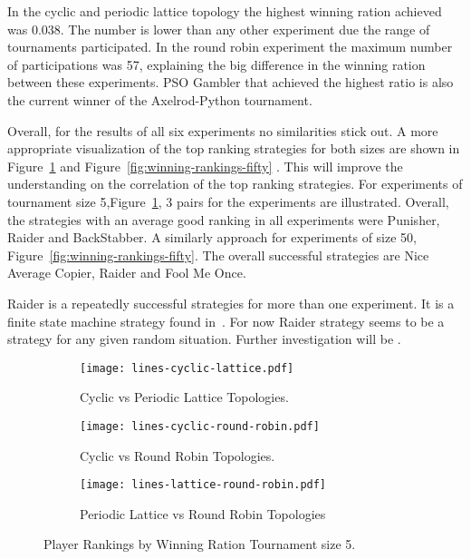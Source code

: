 In the cyclic and periodic lattice topology the highest winning ration achieved
was 0.038. The number is lower than any other experiment due the range of
tournaments participated. In the round robin experiment the maximum number of
participations was 57, explaining the big difference in the winning ration between
these experiments. PSO Gambler that achieved the highest ratio is also the current
winner of the Axelrod-Python tournament.

Overall, for the results of all six experiments no similarities stick out.
A more appropriate visualization of the top ranking strategies for both
sizes are shown in Figure~\ref{fig:winning-rankings-five} and Figure~\ref{fig:winning-rankings-fifty} .
This will improve the understanding on the correlation of the top ranking strategies.
For experiments of tournament size 5,Figure~\ref{fig:winning-rankings-five}, 3
pairs for the experiments are illustrated. Overall, the strategies with an
average good ranking in all experiments were Punisher, Raider and BackStabber.
A similarly approach for experiments of size 50, Figure~\ref{fig:winning-rankings-fifty}.
The overall successful strategies are Nice Average Copier, Raider and Fool Me Once.

Raider is a repeatedly successful strategies for more than one experiment.
It is a finite state machine strategy found in~\cite{DBLP:conf/foci/AshlockTA14}.
For now
Raider strategy seems to be a strategy for any
given random situation. Further investigation will be .

\begin{figure}[ht]
\centering
    \begin{subfigure}[t]{1\textwidth}
    \centering
        \texttt{[image: lines-cyclic-lattice.pdf]}
    \caption{Cyclic vs Periodic Lattice Topologies.}
    \end{subfigure}
\hfill
    \begin{subfigure}[t]{1\textwidth}\centering
    \centering
        \texttt{[image: lines-cyclic-round-robin.pdf]}
    \caption{Cyclic vs Round Robin Topologies.}
    \end{subfigure}
\hfill
    \begin{subfigure}[t]{1\textwidth}\centering
    \centering
        \texttt{[image: lines-lattice-round-robin.pdf]}
    \caption{Periodic Lattice vs Round
             Robin Topologies}
    \end{subfigure}
\caption{Player Rankings by Winning Ration Tournament size 5.}
\label{fig:winning-rankings-five}
\end{figure}

